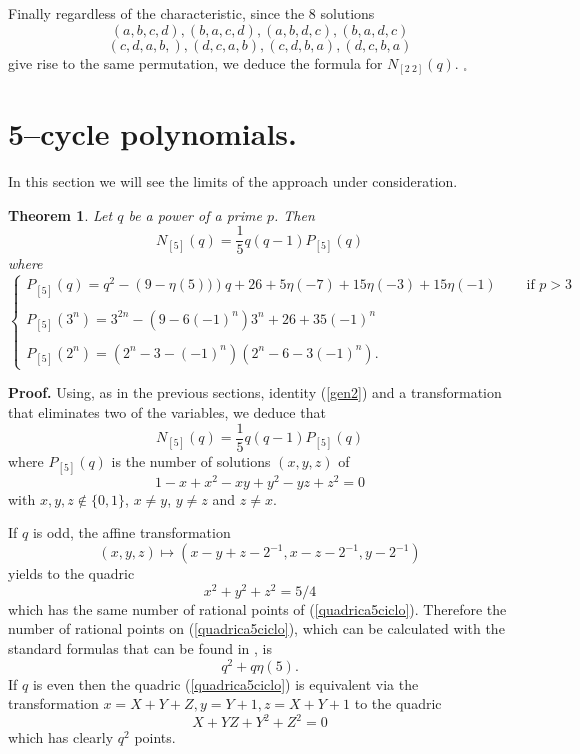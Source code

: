 \documentclass[10pt,a4paper,twoside]{article}
\newtheorem{theorem}{Theorem}[section]
\begin{document}
Finally regardless of the characteristic, since the $8$ solutions
$$
(a,b,c,d), (b,a,c,d), (a,b,d,c), (b,a,d,c)$$
$$ (c,d,a,b,), (d,c,a,b), (c,d,b,a), (d,c,b,a)
$$
give rise to the same permutation, we deduce the formula for $N_{[2\ 2]}(q)$.
\bigskip\hfill $_\square$\bigskip


\section{5--cycle polynomials.}

In this section we will see the limits of the approach under consideration.

\begin{theorem} Let $q$ be a power of a prime $p$. Then
$$N_{[5]}(q)=\frac{1}{5}q(q-1)P_{[5]}(q)$$
where
\begin{equation}\label{laprima}
\left\{
    \begin{array}{ll}
    P_{[5]}(q)=q^2-\left(9-\eta(5))\right)q+26+5\eta(-7)+15\eta(-3)+15\eta(-1)&
\quad\textrm{ if } p>3\\
        &\\
    P_{[5]}(3^n)=3^{2n}-(9-6(-1)^n)3^n+26+35(-1)^n & \\
    &\\
    P_{[5]}(2^n)=(2^n-3-(-1)^n)(2^n-6-3(-1)^n).&
    \end{array}
\right.
\end{equation}
\end{theorem}

\noindent\textbf{Proof.} Using, as in the previous sections, identity
(\ref{gen2}) and a transformation
that eliminates two of the variables, we deduce that
$$N_{[5]}(q)=\frac{1}{5}q(q-1)P_{[5]}(q)$$
where $P_{[5]}(q)$ is the number of solutions $(x,y,z)$ of
\begin{equation}\label{quadrica5ciclo}
1-x+{x}^{2}-x y+{y}^{2}-y z+{z}^{2}=0
\end{equation}
with $x,y,z\not\in\{0,1\}$, $x\neq y$, $y\neq z$ and  $z\neq x$.

If $q$ is odd, the affine transformation
$$(x,y,z)\mapsto (x-y+z-2^{-1},x-z-2^{-1},y-2^{-1})$$
yields to the quadric
$$x^2+y^2+z^2=5/4$$
which has the same number of rational points of (\ref{quadrica5ciclo}).
Therefore the number of rational points
on (\ref{quadrica5ciclo}), which can be calculated with the standard
formulas that can be found in \cite[Theorem 6.27]{LN}, is
\begin{equation}\label{primo}
q^2+q\eta(5).
\end{equation}
If $q$ is even then the quadric (\ref{quadrica5ciclo}) is equivalent
via the transformation $x=X+Y+Z, y=Y+1, z=X+Y+1$ to the quadric
$$X+YZ+Y^2+Z^2=0$$
which has clearly $q^2$ points.
\end{document}
